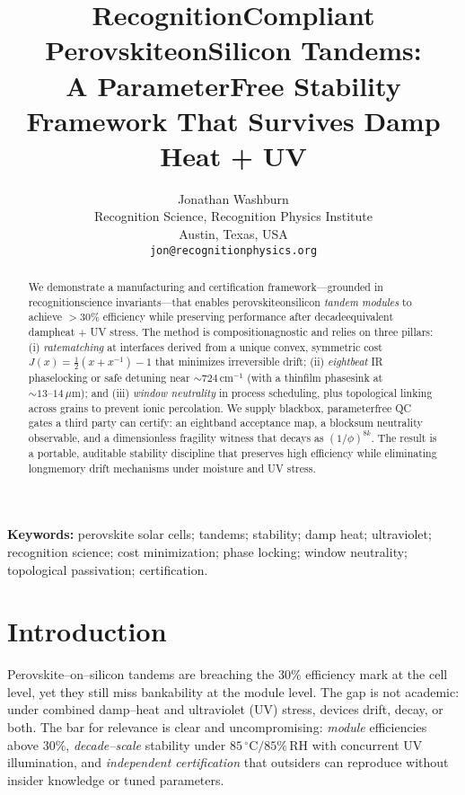 \documentclass[12pt]{article}
\title{Recognition\textendash Compliant Perovskite\textendash on\textendash Silicon Tandems:\\
A Parameter\textendash Free Stability Framework That Survives Damp Heat + UV}
\author{Jonathan Washburn\\
Recognition Science, Recognition Physics Institute\\
Austin, Texas, USA\\
\texttt{jon@recognitionphysics.org}
}
\date{} %
\begin{document}
\maketitle

\begin{abstract}
We demonstrate a manufacturing and certification framework---grounded in recognition\textendash science invariants---that enables perovskite\textendash on\textendash silicon \emph{tandem modules} to achieve $>30\%$ efficiency while preserving performance after decade\textendash equivalent damp\textendash heat + UV stress. The method is composition\textendash agnostic and relies on three pillars: (i) \emph{rate\textendash matching} at interfaces derived from a unique convex, symmetric cost $J(x)=\tfrac12\!\left(x+x^{-1}\right)-1$ that minimizes irreversible drift; (ii) \emph{eight\textendash beat} IR phase\textendash locking or safe detuning near $\sim 724\,\mathrm{cm}^{-1}$ (with a thin\textendash film phase\textendash sink at $\sim 13\text{--}14\,\mu\mathrm{m}$); and (iii) \emph{window neutrality} in process scheduling, plus topological linking across grains to prevent ionic percolation. We supply black\textendash box, parameter\textendash free QC gates a third party can certify: an eight\textendash band acceptance map, a block\textendash sum neutrality observable, and a dimensionless fragility witness that decays as $(1/\phi)^{8k}$. The result is a portable, auditable stability discipline that preserves high efficiency while eliminating long\textendash memory drift mechanisms under moisture and UV stress.
\end{abstract}

\noindent\textbf{Keywords:} perovskite solar cells; tandems; stability; damp heat; ultraviolet; recognition science; cost minimization; phase locking; window neutrality; topological passivation; certification.

\section{Introduction}

Perovskite–on–silicon tandems are breaching the $30\%$ efficiency mark at the cell level, yet they still miss bankability at the module level. The gap is not academic: under combined damp–heat and ultraviolet (UV) stress, devices drift, decay, or both. The bar for relevance is clear and uncompromising: \emph{module} efficiencies above $30\%$, \emph{decade–scale} stability under $85\,^{\circ}\mathrm{C}/85\%\,\mathrm{RH}$ with concurrent UV illumination, and \emph{independent certification} that outsiders can reproduce without insider knowledge or tuned parameters.
\end{document}

